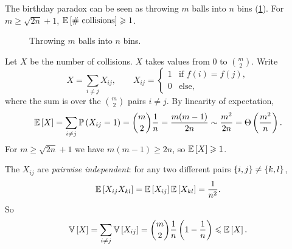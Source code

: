 The birthday paradox can be seen as throwing $m$ balls into $n$ bins (\cref{fig:balls-0903}). For
$m \geq \sqrt{2n} + 1$, $\operatorname{\mathbb{E}}\left[\text{\# collisions}\right] \geqslant 1$.

\begin{figure}[ht]
    \centering
    \caption{Throwing $m$ balls into $n$ bins.}
    \label{fig:balls-0903}
\end{figure}

Let $X$ be the number of collisions. $X$ takes values from $0$ to $\binom{m}{2}$. Write
\[X = \sum_{i \neq j} X_{ij},
    \qquad
    X_{ij} = \begin{cases}
        1 & \text{if } f(i) = f(j), \\
        0 & \text{else,}
    \end{cases}\]
where the sum is over the $\binom{m}{2}$ pairs $i \neq j$. By linearity of expectation,
\[\operatorname{\mathbb{E}}\left[X\right] = \sum_{i \neq j} \operatorname{\mathbb{P}}\left(X_{ij} = 1\right) = \binom{m}{2} \frac{1}{n}
    = \frac{m(m-1)}{2n} \sim \frac{m^2}{2n} = \Theta\left(\frac{m^2}{n}\right).\]
For $m \geq \sqrt{2n} + 1$ we have $m(m-1) \geq 2n$, so $\operatorname{\mathbb{E}}\left[X\right] \geqslant 1$.

\begin{claim}\label{lem:pairwise-0903}
    The $X_{ij}$ are \emph{pairwise independent}: for any two different pairs
    $\left\lbrace i,j\right\rbrace \neq \left\lbrace k,l\right\rbrace$,
    \[\operatorname{\mathbb{E}}\left[X_{ij} X_{kl}\right] = \operatorname{\mathbb{E}}\left[X_{ij}\right] \operatorname{\mathbb{E}}\left[X_{kl}\right] = \frac{1}{n^2}.\]
    So
    \[\operatorname{\mathbb{V}}\left[X\right] = \sum_{i \neq j} \operatorname{\mathbb{V}}\left[X_{ij}\right]
        = \binom{m}{2} \frac{1}{n} \left(1 - \frac{1}{n}\right) \leqslant \operatorname{\mathbb{E}}\left[X\right].\]
\end{claim}

